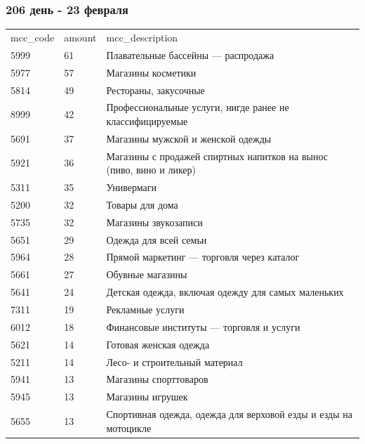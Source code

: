 \documentclass{beamer}
\begin{document}
\begin{frame}
\frametitle{206 день - 23 февраля}

\begin{adjustbox}{width=1\textwidth}
\begin{tabular}{lll}
    mcc\_code & amount & mcc\_description                                                    \\
    5999      & 61     & Плавательные бассейны — распродажа                                  \\
    5977      & 57     & Магазины косметики                                                  \\
    5814      & 49     & Рестораны, закусочные                                               \\
    8999      & 42     & Профессиональные услуги, нигде ранее не классифицируемые            \\
    5691      & 37     & Магазины мужской и женской одежды                                   \\
    5921      & 36     & Магазины с продажей спиртных напитков на вынос (пиво, вино и ликер) \\
    5311      & 35     & Универмаги                                                          \\
    5200      & 32     & Товары для дома                                                     \\
    5735      & 32     & Магазины звукозаписи                                                \\
    5651      & 29     & Одежда для всей семьи                                               \\
    5964      & 28     & Прямой маркетинг — торговля через каталог                           \\
    5661      & 27     & Обувные магазины                                                    \\
    5641      & 24     & Детская одежда, включая одежду для самых маленьких                  \\
    7311      & 19     & Рекламные услуги                                                    \\
    6012      & 18     & Финансовые институты — торговля и услуги                            \\
    5621      & 14     & Готовая женская одежда                                              \\
    5211      & 14     & Лесо- и строительный материал                                       \\
    5941      & 13     & Магазины спорттоваров                                               \\
    5945      & 13     & Магазины игрушек                                                    \\
    5655      & 13     & Спортивная одежда, одежда для верховой езды и езды на мотоцикле
\end{tabular}
\end{adjustbox}

\end{frame}
\end{document}
